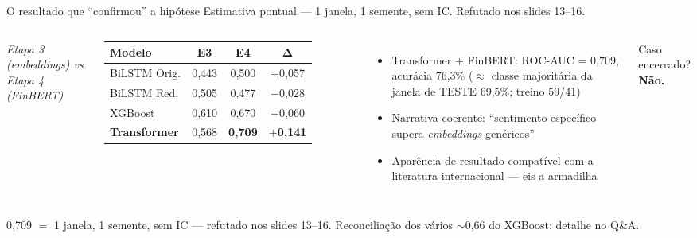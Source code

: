 \documentclass[10pt,aspectratio=169]{beamer}
\begin{document}
\begin{frame}{O resultado que ``confirmou'' a hipótese}
  {\footnotesize\alert{Estimativa pontual --- 1 janela, 1 semente, sem IC. Refutado nos slides 13--16.}}
  \vspace{0.5ex}
  \begin{columns}[T]
    \begin{table}
      \footnotesize
      {\scriptsize\itshape Etapa 3 (\textit{embeddings}) vs Etapa 4 (FinBERT)}\\[0.5ex]
      \begin{tabular}{lccc}
        \toprule
        \textbf{Modelo} & \textbf{E3} & \textbf{E4} & $\boldsymbol{\Delta}$ \\
        \midrule
        BiLSTM Orig.    & 0{,}443 & 0{,}500 & $+$0{,}057 \\
        BiLSTM Red.     & 0{,}505 & 0{,}477 & $-$0{,}028 \\
        XGBoost         & 0{,}610 & 0{,}670 & $+$0{,}060 \\
        \textbf{Transformer} & 0{,}568 & \alert{\textbf{0{,}709}} & \textbf{$+$0{,}141} \\
        \bottomrule
      \end{tabular}
    \end{table}
    \begin{itemize}
      \item Transformer + FinBERT: \alert{ROC-AUC = 0{,}709}, acurácia 76{,}3\% \alert{($\approx$ classe majoritária da janela de TESTE 69{,}5\%; treino 59/41)}
      \item Narrativa coerente: ``sentimento específico supera \textit{embeddings} genéricos''
      \item \alert{Aparência} de resultado compatível com a literatura internacional --- eis a armadilha
    \end{itemize}
    \vspace{1ex}
    \centering\large
    Caso encerrado? \alert{\textbf{Não.}}
  \end{columns}
  \vspace{1ex}
  {\footnotesize \alert{0{,}709 $=$ 1 janela, 1 semente, sem IC} --- refutado nos slides 13--16. Reconciliação dos vários $\sim$0{,}66 do XGBoost: detalhe no Q\&A.}
\end{frame}
\end{document}
